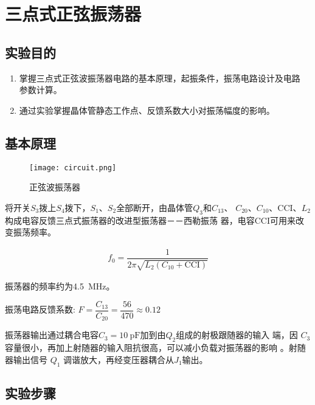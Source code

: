 \documentclass[../main]{subfiles}
\begin{document}
\chapter{三点式正弦振荡器}%
\label{cha:三点式正弦振荡器}

\section{实验目的}%
\label{sec:\arabic{chapter}实验目的}

\begin{enumerate}

	\item 掌握三点式正弦波振荡器电路的基本原理，起振条件，振荡电路设计及电路
		参数计算。

	\item 通过实验掌握晶体管静态工作点、反馈系数大小对振荡幅度的影响。

\end{enumerate}

\section{基本原理}%
\label{sec:\arabic{chapter}基本原理}

\begin{figure}[htbp]
	\centering
	\texttt{[image: circuit.png]}
	\caption{正弦波振荡器}
	\label{fig:正弦波振荡器}
\end{figure}

将开关$S_3$拨上$S_4$拨下，$S_1$、$S_2$全部断开，由晶体管$Q_3$和$C_{13}$、
$C_{20}$、$C_{10}$、CCI、$L_2$构成电容反馈三点式振荡器的改进型振荡器－－西勒振荡
器，电容CCI可用来改变振荡频率。

\begin{align}
	f_0 = \dfrac{1}{2\pi \sqrt{L_2(C_{10} + \mathrm{CCI})}}
\end{align}

振荡器的频率约为\SI{4.5}{\MHz}。

振荡电路反馈系数: $ F = \dfrac{C_{13}}{C_{20}} = \dfrac{56}{470} \approx 0.12 $

振荡器输出通过耦合电容$ C_3 = \SI{10}{\pF} $加到由$ Q_2 $组成的射极跟随器的输入
端，因 $ C_3 $ 容量很小，再加上射随器的输入阻抗很高，可以减小负载对振荡器的影响
。射随器输出信号 $ Q_1 $ 调谐放大，再经变压器耦合从$ J_1 $输出。

\section{实验步骤}%
\label{sec:\arabic{chapter}实验步骤}
\end{document}
